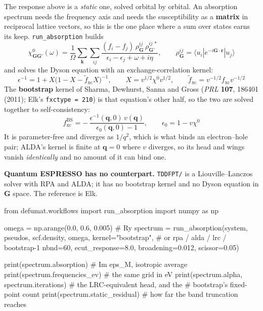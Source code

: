 \documentclass[11pt,a4paper]{article}
\newcommand{\code}[1]{\texttt{\small #1}}
\begin{document}
The response above is a \emph{static} one, solved orbital by orbital. An
absorption spectrum needs the frequency axis and needs the susceptibility as a
\textbf{matrix} in reciprocal lattice vectors, so this is the one place where a
sum over states earns its keep. \code{run\_absorption} builds
\begin{equation*}
\chi^0_{\mathbf{GG}'}(\omega) = \frac{1}{\Omega}\sum_{\mathbf k}\sum_{ij}
  \frac{(f_i - f_j)\,\rho^{ij}_{\mathbf G}\,\rho^{ij\,*}_{\mathbf G'}}
       {\epsilon_i - \epsilon_j + \omega + i\eta},
\qquad
\rho^{ij}_{\mathbf G} = \langle u_i|e^{-i\mathbf G\cdot\mathbf r}|u_j\rangle
\end{equation*}
and solves the Dyson equation with an exchange-correlation kernel:
\begin{equation*}
\epsilon^{-1} = 1 + X\big(1 - X - \tilde f_{\mathrm{xc}} X\big)^{-1},
\qquad X = v^{1/2}\chi^0 v^{1/2},
\qquad \tilde f_{\mathrm{xc}} = v^{-1/2} f_{\mathrm{xc}} v^{-1/2}
\end{equation*}
The \textbf{bootstrap} kernel of Sharma, Dewhurst, Sanna and Gross
(\emph{PRL} \textbf{107}, 186401 (2011); Elk's \code{fxctype = 210}) is that
equation's other half, so the two are solved together to self-consistency:
\begin{equation*}
f^{\mathrm{BS}}_{\mathrm{xc}}
  = -\,\frac{\epsilon^{-1}(\mathbf q, 0)\,v(\mathbf q)}{\epsilon_0(\mathbf q,0)-1},
\qquad \epsilon_0 = 1 - v\chi^0
\end{equation*}
It is parameter-free and diverges as $1/q^2$, which is what binds an
electron--hole pair; ALDA's kernel is finite at $\mathbf q = 0$ where $v$
diverges, so its head and wings vanish \emph{identically} and no amount of it
can bind one.

\textbf{Quantum ESPRESSO has no counterpart.} \code{TDDFPT/} is a
Liouville--Lanczos solver with RPA and ALDA; it has no bootstrap kernel and no
Dyson equation in $\mathbf G$ space. The reference is Elk.

\begin{pycode}
from defumat.workflows import run_absorption
import numpy as np

omega = np.arange(0.0, 0.6, 0.005)          # Ry
spectrum = run_absorption(system, pseudos, scf.density, omega,
                          kernel="bootstrap",   # or rpa / alda / lrc / bootstrap-1
                          nbnd=60, ecut_response=8.0,
                          broadening=0.012, scissor=0.05)

print(spectrum.absorption)                  # Im eps_M, isotropic average
print(spectrum.frequencies_ev)              # the same grid in eV
print(spectrum.alpha, spectrum.iterations)  # the LRC-equivalent head, and the
                                            # bootstrap's fixed-point count
print(spectrum.static_residual)             # how far the band truncation reaches
\end{pycode}
\end{document}
